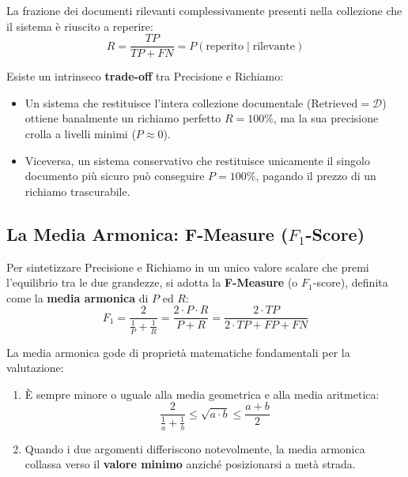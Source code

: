 \begin{definition}
La frazione dei documenti rilevanti complessivamente presenti nella collezione che il sistema è riuscito a reperire:
\begin{equation}
R = \frac{TP}{TP + FN} = P(\text{reperito} \mid \text{rilevante})
\end{equation}
\end{definition}

Esiste un intrinseco \textbf{trade-off} tra Precisione e Richiamo:
\begin{itemize}
    \item Un sistema che restituisce l'intera collezione documentale ($\text{Retrieved} = \mathcal{D}$) ottiene banalmente un richiamo perfetto $R = 100\%$, ma la sua precisione crolla a livelli minimi ($P \approx 0$).
    \item Viceversa, un sistema conservativo che restituisce unicamente il singolo documento più sicuro può conseguire $P = 100\%$, pagando il prezzo di un richiamo trascurabile.
\end{itemize}

\subsection{\texorpdfstring{La Media Armonica: F-Measure ($F_1$-Score)}{La Media Armonica: F-Measure (F1-Score)}}
Per sintetizzare Precisione e Richiamo in un unico valore scalare che premi l'equilibrio tra le due grandezze, si adotta la \textbf{F-Measure} (o $F_1$-score), definita come la \textbf{media armonica} di $P$ ed $R$:
\begin{equation}
F_1 = \frac{2}{\frac{1}{P} + \frac{1}{R}} = \frac{2 \cdot P \cdot R}{P + R} = \frac{2 \cdot TP}{2 \cdot TP + FP + FN}
\end{equation}

\begin{property}
La media armonica gode di proprietà matematiche fondamentali per la valutazione:
\begin{enumerate}
    \item È sempre minore o uguale alla media geometrica e alla media aritmetica:
    \[
    \frac{2}{\frac{1}{a} + \frac{1}{b}} \le \sqrt{a \cdot b} \le \frac{a + b}{2}
    \]
    \item Quando i due argomenti differiscono notevolmente, la media armonica collassa verso il \textbf{valore minimo} anziché posizionarsi a metà strada.
\end{enumerate}
\end{property}

